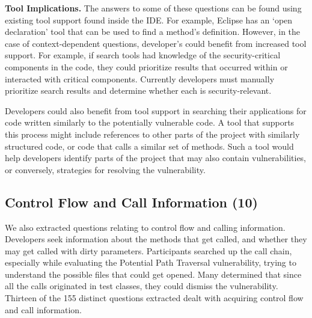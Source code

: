 \documentclass[conference]{IEEEtran}
\begin{document}
\noindent\textbf{Tool Implications.}
The answers to some of these questions can be found using existing tool support found inside the IDE. 
For example, Eclipse has an `open declaration' tool that can be used to find a method's definition. 
However, in the case of context-dependent questions, developer's could benefit from increased tool support. 
For example, if search tools had knowledge of the security-critical components in the code, they could prioritize results that occurred within or interacted with critical components.
Currently developers must manually prioritize search results and determine whether each is security-relevant.

Developers could also benefit from tool support in searching their applications for code written similarly to the potentially vulnerable code. 
A tool that supports this process might include references to other parts of the project with similarly structured code, or code that calls a similar set of methods. 
Such a tool would help developers identify parts of the project that may also contain vulnerabilities, or conversely, strategies for resolving the vulnerability.



\noindent\subsection{\textbf{Control Flow and Call Information (10)}}\label{cf}
We also extracted questions relating to control flow and calling information. 
Developers seek information about the methods that get called, and whether they may get called with dirty parameters.
Participants searched up the call chain, especially while evaluating the Potential Path Traversal vulnerability, trying to understand the possible files that could get opened. 
Many determined that since all the calls originated in test classes, they could dismiss the vulnerability.
Thirteen of the 155 distinct questions extracted dealt with acquiring control flow and call information.
\\
\end{document}
